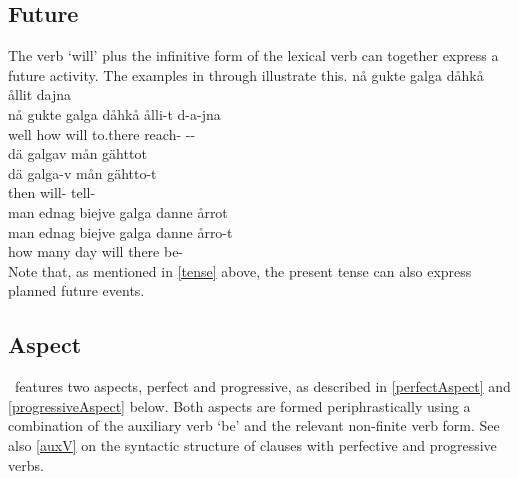 \subsection{Future}\label{futureTense}
The verb  ‘will’ plus the infinitive form of the lexical verb can together express a future activity. The examples in  through  illustrate this.
\ea\label{futureTenseEx1}%
\glll	nå gukte galga dåhkå ållit dajna\\
	nå gukte galga dåhkå ålli-t d-a-jna\\
	well how will\BS{} to.there reach- --\\\nopagebreak
{}	
\z
\ea\label{futureTenseEx2}%
\glll	dä galgav mån gähttot\\
	dä galga-v mån gähtto-t\\
	then will-  tell-\\\nopagebreak
{}	
\z
\ea\label{futureTenseEx3}%
\glll	man ednag biejve galga danne årrot\\
	man ednag biejve galga danne årro-t\\
	how many day\BS{} will\BS{} there be-\\\nopagebreak
{}	
\z
Note that, as mentioned in \SEC\ref{tense} above, the present tense can also express planned future events. 

\subsection{Aspect}\label{aspect}
\PS\ features two aspects, perfect and progressive, as described in \SEC\ref{perfectAspect} and \SEC\ref{progressiveAspect} below. Both aspects are formed periphrastically using a combination of the auxiliary verb  ‘be’ and the relevant non-finite verb form. 
See also \SEC\ref{auxV} on the syntactic structure of clauses with perfective and progressive verbs. 

